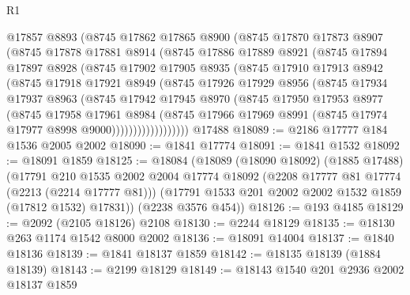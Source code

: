 \begin{lexlean}{R1}
\begin{coremodule}
          @17857
          @8893
          (@8745
            @17862
            @17865
            @8900
            (@8745
              @17870
              @17873
              @8907
              (@8745
                @17878
                @17881
                @8914
                (@8745
                  @17886
                  @17889
                  @8921
                  (@8745
                    @17894
                    @17897
                    @8928
                    (@8745
                      @17902
                      @17905
                      @8935
                      (@8745
                        @17910
                        @17913
                        @8942
                        (@8745
                          @17918
                          @17921
                          @8949
                          (@8745
                            @17926
                            @17929
                            @8956
                            (@8745
                              @17934
                              @17937
                              @8963
                              (@8745
                                @17942
                                @17945
                                @8970
                                (@8745
                                  @17950
                                  @17953
                                  @8977
                                  (@8745
                                    @17958
                                    @17961
                                    @8984
                                    (@8745
                                      @17966
                                      @17969
                                      @8991
                                      (@8745 @17974 @17977 @8998 @9000))))))))))))))))))
    @17488
@18089 := @2186 @17777 @184 @1536 @2005 @2002
@18090 := @1841 @17774
@18091 := @1841 @1532
@18092 := @18091 @1859
@18125 := @18084
    (@18089
      (@18090 @18092)
      (@1885 @17488)
      (@17791
        @210
        @1535
        @2002
        @2004
        @17774
        @18092
        (@2208 @17777 @81 @17774 (@2213 (@2214 @17777 @81)))
        (@17791 @1533 @201 @2002 @2002 @1532 @1859 (@17812 @1532) @17831))
      (@2238 @3576 @454))
@18126 := @193 @4185
@18129 := @2092 (@2105 @18126) @2108
@18130 := @2244 @18129
@18135 := @18130 @263 @1174 @1542 @8000 @2002
@18136 := @18091 @14004
@18137 := @1840 @18136
@18139 := @1841 @18137 @1859
@18142 := @18135 @18139 (@1884 @18139)
@18143 := @2199 @18129
@18149 := @18143 @1540 @201 @2936 @2002 @18137 @1859

\end{coremodule}
\end{lexlean}
